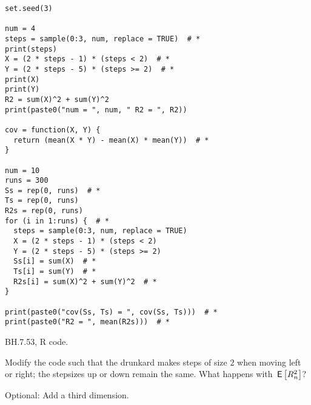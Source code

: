 \begin{listing}[!ht]
\begin{verbatim}
set.seed(3)

num = 4
steps = sample(0:3, num, replace = TRUE)  # *
print(steps)
X = (2 * steps - 1) * (steps < 2)  # *
Y = (2 * steps - 5) * (steps >= 2)  # *
print(X)
print(Y)
R2 = sum(X)^2 + sum(Y)^2
print(paste0("num = ", num, " R2 = ", R2))

cov = function(X, Y) {
  return (mean(X * Y) - mean(X) * mean(Y))  # *
}

num = 10
runs = 300
Ss = rep(0, runs)  # *
Ts = rep(0, runs)
R2s = rep(0, runs)
for (i in 1:runs) {  # *
  steps = sample(0:3, num, replace = TRUE)
  X = (2 * steps - 1) * (steps < 2)
  Y = (2 * steps - 5) * (steps >= 2)
  Ss[i] = sum(X)  # *
  Ts[i] = sum(Y)  # *
  R2s[i] = sum(X)^2 + sum(Y)^2  # *
}

print(paste0("cov(Ss, Ts) = ", cov(Ss, Ts)))  # *
print(paste0("R2 = ", mean(R2s)))  # *
\end{verbatim}
\caption{BH.7.53, R code.}
\label{BH.7.53.r}
\end{listing}

\begin{exercise}
Modify the code such that the drunkard makes steps of size $2$ when moving left or right; the stepsizes up or down remain the same. What happens with $\,\mathsf{E}\left[R^{2}_n\right]$?
\end{exercise}

\begin{exercise}
Optional: Add a third dimension.
\end{exercise}



